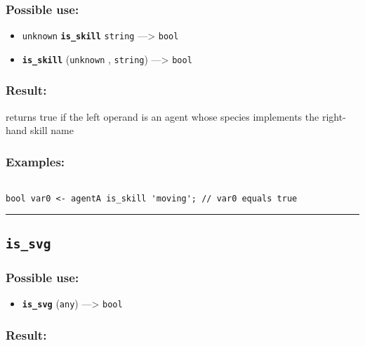 \documentclass[]{book}
\providecommand{\tightlist}{%
  \setlength{\itemsep}{0pt}\setlength{\parskip}{0pt}}
\theoremstyle{definition}
\theoremstyle{definition}
\theoremstyle{definition}
\theoremstyle{remark}
\begin{document}
\subsubsection{Possible use:}\label{possible-use-303}

\begin{itemize}
\tightlist
\item
  \texttt{unknown} \textbf{\texttt{is\_skill}} \texttt{string}
  ---\textgreater{} \texttt{bool}
\item
  \textbf{\texttt{is\_skill}} (\texttt{unknown} , \texttt{string})
  ---\textgreater{} \texttt{bool}
\end{itemize}

\subsubsection{Result:}\label{result-293}

returns true if the left operand is an agent whose species implements
the right-hand skill name

\subsubsection{Examples:}\label{examples-217}

\begin{verbatim}
 
bool var0 <- agentA is_skill 'moving'; // var0 equals true
\end{verbatim}

\begin{center}\rule{0.5\linewidth}{\linethickness}\end{center}

\subsection{\texorpdfstring{\texttt{is\_svg}}{is\_svg}}\label{is_svg}

\subsubsection{Possible use:}\label{possible-use-304}

\begin{itemize}
\tightlist
\item
  \textbf{\texttt{is\_svg}} (\texttt{any}) ---\textgreater{}
  \texttt{bool}
\end{itemize}

\subsubsection{Result:}\label{result-294}
\end{document}
